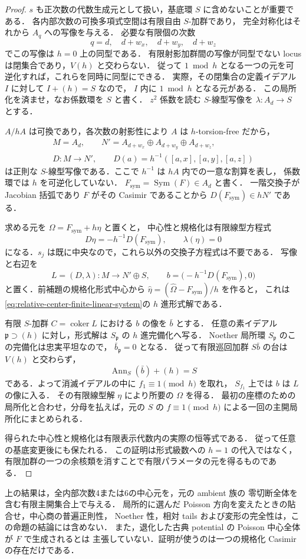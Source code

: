 \begin{proof}
$s$ も正次数の代数生成元として扱い，基底環 $S$ に含めないことが重要である．
各内部次数の可換多項式空間は有限自由 $S$-加群であり，
完全対称化はそれから $A_q$ への写像を与える．
必要な有限個の次数
\[
 q=d,\quad d+w_x,\quad d+w_y,\quad d+w_z
\]
でこの写像は $h=0$ 上の同型である．
有限射影加群間の写像が同型でない locus は閉集合であり，$V(h)$ と交わらない．
従って $1\bmod h$ となる一つの元を可逆化すれば，これらを同時に同型にできる．
実際，その閉集合の定義イデアル $I$ に対して $I+(h)=S$ なので，
$I$ 内に $1\bmod h$ となる元がある．
この局所化を済ませ，なお係数環を $S$ と書く．
$z^2$ 係数を読む $S$-線型写像を
$\lambda:A_d\to S$ とする．

$A/hA$ は可換であり，各次数の射影性により $A$ は $h$-torsion-free だから，
\[
 \begin{gathered}
 M=A_d,\qquad N'=A_{d+w_x}\oplus A_{d+w_y}\oplus A_{d+w_z},\\
 D:M\longrightarrow N',\qquad
 D(a)=h^{-1}([a,x],[a,y],[a,z])
 \end{gathered}
\]
は正則な $S$-線型写像である．ここで $h^{-1}$ は $hA$ 内での一意な割算を表し，
係数環では $h$ を可逆化していない．
$F_{\mathrm{sym}}=\operatorname{Sym}(F)\in A_d$ と書く．
一階交換子が Jacobian 括弧であり $F$ がその Casimir であることから
$D(F_{\mathrm{sym}})\in hN'$ である．

求める元を $\Omega=F_{\mathrm{sym}}+h\eta$ と置くと，
中心性と規格化は有限線型方程式
\begin{equation}\label{eq:relative-center-finite-linear-system}
 D\eta=-h^{-1}D(F_{\mathrm{sym}}),\qquad\lambda(\eta)=0
\end{equation}
になる．$s_j$ は既に中央なので，これら以外の交換子方程式は不要である．
写像と右辺を
\[
 L=(D,\lambda):M\longrightarrow N'\oplus S,\qquad
 b=\bigl(-h^{-1}D(F_{\mathrm{sym}}),0\bigr)
\]
と置く．前補題の規格化形式中心から
$\widehat\eta=(\widehat\Omega-F_{\mathrm{sym}})/h$ を作ると，
これは\eqref{eq:relative-center-finite-linear-system}の $h$ 進形式解である．

有限 $S$-加群 $C=\operatorname{coker}L$ における $b$ の像を $\bar b$ とする．
任意の素イデアル $\mathfrak p\supset(h)$ に対し，形式解は
$S_{\mathfrak p}$ の $h$ 進完備化へ写る．
Noether 局所環 $S_{\mathfrak p}$ のこの完備化は忠実平坦なので，
$\bar b_{\mathfrak p}=0$ となる．
従って有限巡回加群 $S\bar b$ の台は $V(h)$ と交わらず，
\[
 \operatorname{Ann}_S(\bar b)+(h)=S
\]
である．よって消滅イデアルの中に $f_1\equiv1\pmod h$ を取れ，
$S_{f_1}$ 上では $b$ は $L$ の像に入る．
その有限線型解 $\eta$ により所要の $\Omega$ を得る．
最初の座標のための局所化と合わせ，分母を払えば，元の $S$ の
$f\equiv1\pmod h$ による一回の主開局所化にまとめられる．

得られた中心性と規格化は有限表示代数内の実際の恒等式である．
従って任意の基底変更後にも保たれる．
この証明は形式級数への $h=1$ の代入ではなく，
有限加群の一つの余核類を消すことで有限パラメータの元を得るものである．
\end{proof}

\begin{remark}[この命題が与える範囲]
上の結果は，全内部次数4または6の中心元を，元の ambient 族の
零切断全体を含む有限主開集合上で与える．
局所的に選んだ Poisson 方向を変えたときの貼合せ，中心商の普遍正則性，
Noether 性，相対 tails および変形の完全性は，この命題の結論には含めない．
また，退化した古典 potential の Poisson 中心全体が $F$ で生成されるとは
主張していない．証明が使うのは一つの規格化 Casimir の存在だけである．
\end{remark}
